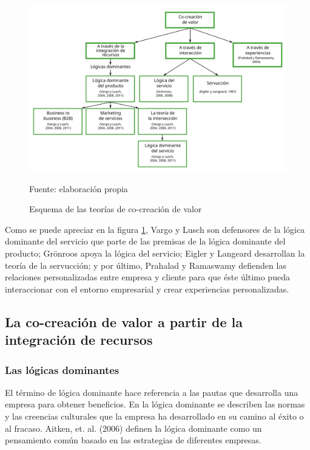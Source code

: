 \begin{figure}[!h]
	\caption{Esquema de las teorías de co-creación de valor}
	\centering \includegraphics[width=150mm]{capitulos/graficos/esquema} 
	\label{fig:esquema} 
	
		\footnotesize
		Fuente: elaboración propia
\end{figure}

Como se puede apreciar en la figura \ref{fig:esquema}, Vargo y Lusch son defensores de la lógica dominante del servicio que parte de las premisas de la lógica dominante del producto; Grönroos apoya la lógica del servicio; Eigler y Langeard desarrollan la teoría de la servucción; y por último, Prahalad y Ramaswamy defienden las relaciones personalizadas entre empresa y cliente para que éste último pueda interaccionar con el entorno empresarial y crear experiencias personalizadas. 

\subsection{La co-creación de valor a partir de la integración de recursos}

\subsubsection{Las lógicas dominantes}

El término de lógica dominante hace referencia a las pautas que desarrolla una empresa para obtener beneficios. En la lógica dominante se describen las normas y las creencias culturales que la empresa ha desarrollado en su camino al éxito o al fracaso. Aitken, et. al. (2006) definen la lógica dominante como un pensamiento común basado en las estrategias de diferentes empresas.

